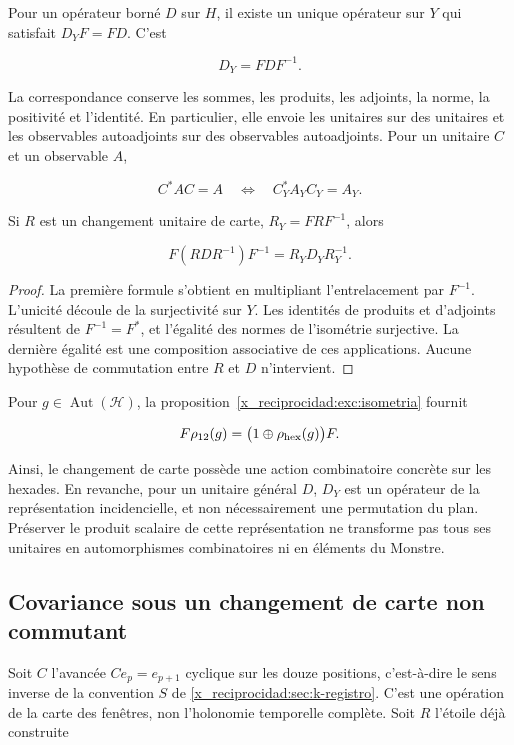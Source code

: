 \begin{theorem}
Pour un opérateur borné \(D\) sur \(H\), il existe un unique opérateur sur \(Y\) qui satisfait \(D_YF=FD\). C’est

\[
D_Y=FDF^{-1}.
\]

La correspondance conserve les sommes, les produits, les adjoints, la norme, la positivité et l’identité. En particulier, elle envoie les unitaires sur des unitaires et les observables autoadjoints sur des observables autoadjoints. Pour un unitaire \(C\) et un observable \(A\),

\[
C^*AC=A\quad\Longleftrightarrow\quad C_Y^*A_YC_Y=A_Y.
\]

Si \(R\) est un changement unitaire de carte, \(R_Y=FRF^{-1}\), alors


\[
F(RDR^{-1})F^{-1}=R_YD_YR_Y^{-1}.
\]
\end{theorem}

\begin{proof}
La première formule s’obtient en multipliant l’entrelacement par \(F^{-1}\). L’unicité découle de la surjectivité sur \(Y\). Les identités de produits et d’adjoints résultent de \(F^{-1}=F^*\), et l’égalité des normes de l’isométrie surjective. La dernière égalité est une composition associative de ces applications. Aucune hypothèse de commutation entre \(R\) et \(D\) n’intervient.
\end{proof}

Pour \(g\in\operatorname{Aut}(\mathcal H)\), la proposition~\ref{x_reciprocidad:exc:isometria} fournit

\[
F\rho_{12}(g)=\bigl(1\oplus\rho_{\rm hex}(g)\bigr)F.
\]

Ainsi, le changement de carte possède une action combinatoire concrète sur les hexades. En revanche, pour un unitaire général \(D\), \(D_Y\) est un opérateur de la représentation incidencielle, et non nécessairement une permutation du plan. Préserver le produit scalaire de cette représentation ne transforme pas tous ses unitaires en automorphismes combinatoires ni en éléments du Monstre.

\subsection{Covariance sous un changement de carte non commutant}

Soit \(C\) l’avancée \(Ce_p=e_{p+1}\) cyclique sur les douze positions, c’est-à-dire le sens inverse de la convention \(S\) de \cref{x_reciprocidad:sec:k-registro}. C’est une opération de la carte des fenêtres, non l’holonomie temporelle complète. Soit \(R\) l’étoile déjà construite

